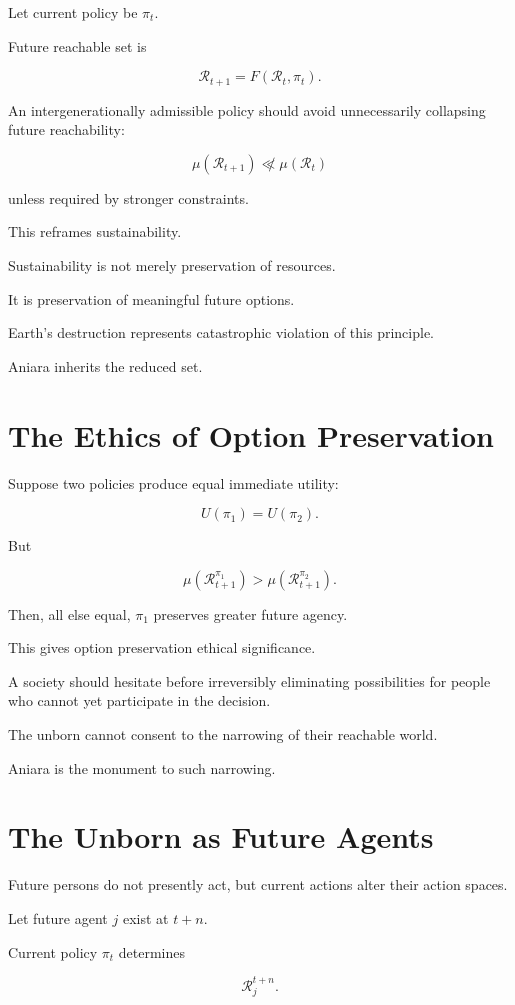 \documentclass[11pt,oneside]{book}
\theoremstyle{definition}
\theoremstyle{remark}
\newcommand{\R}{\mathcal{R}}
\begin{document}
Let current policy be \(\pi_t\).

Future reachable set is

\[
\R_{t+1}
=
F(\R_t,\pi_t).
\]

An intergenerationally admissible policy should avoid unnecessarily collapsing future reachability:

\[
\mu(\R_{t+1})
\not\ll
\mu(\R_t)
\]

unless required by stronger constraints.

This reframes sustainability.

Sustainability is not merely preservation of resources.

It is preservation of meaningful future options.

Earth's destruction represents catastrophic violation of this principle.

Aniara inherits the reduced set.

\section{The Ethics of Option Preservation}

Suppose two policies produce equal immediate utility:

\[
U(\pi_1)=U(\pi_2).
\]

But

\[
\mu(\R_{t+1}^{\pi_1})
>
\mu(\R_{t+1}^{\pi_2}).
\]

Then, all else equal, \(\pi_1\) preserves greater future agency.

This gives option preservation ethical significance.

A society should hesitate before irreversibly eliminating possibilities for people who cannot yet participate in the decision.

The unborn cannot consent to the narrowing of their reachable world.

Aniara is the monument to such narrowing.

\section{The Unborn as Future Agents}

Future persons do not presently act, but current actions alter their action spaces.

Let future agent \(j\) exist at \(t+n\).

Current policy \(\pi_t\) determines

\[
\R_j^{t+n}.
\]
\end{document}

